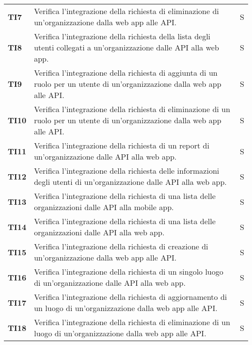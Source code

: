 \documentclass[../../piano-di-qualifica.tex]{subfiles}
\begin{document}
\begin{longtable}[H]{>{\centering\bfseries}m{3cm} >{}m{10cm} >{\centering\arraybackslash}m{3cm}}
  TI7                & Verifica l'integrazione della richiesta di eliminazione di un'organizzazione dalla web app alle API\@.   & S \\

  TI8                & Verifica l'integrazione della richiesta della lista degli utenti collegati a un'organizzazione dalle API alla web app.   & S \\

  TI9                & Verifica l'integrazione della richiesta di aggiunta di un ruolo per un utente di un'organizzazione dalla web app alle API\@.   & S \\

  TI10               & Verifica l'integrazione della richiesta di eliminazione di un ruolo per un utente di un'organizzazione dalla web app alle API\@.   & S \\

  TI11               & Verifica l'integrazione della richiesta di un report di un'organizzazione dalle API alla web app.   & S \\

  TI12               & Verifica l'integrazione della richiesta delle informazioni degli utenti di un'organizzazione dalle API alla web app.   & S \\

  TI13               & Verifica l'integrazione della richiesta di una lista delle organizzazioni dalle API alla mobile app.   & S  \\

  TI14               & Verifica l'integrazione della richiesta di una lista delle organizzazioni dalle API alla web app.   & S  \\

  TI15               & Verifica l'integrazione della richiesta di creazione di un'organizzazione dalla web app alle API\@.   & S  \\

  TI16               & Verifica l'integrazione della richiesta di un singolo luogo di un'organizzazione dalle API alla web app.   & S \\

  TI17               & Verifica l'integrazione della richiesta di aggiornamento di un luogo di un'organizzazione dalla web app alle API\@.   & S \\

  TI18               & Verifica l'integrazione della richiesta di eliminazione di un luogo di un'organizzazione dalla web app alle API\@.   & S \\


\end{longtable}
\end{document}
